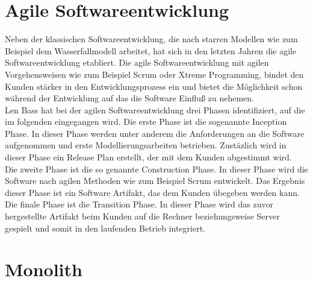 \section{Agile Softwareentwicklung}
Neben der klassischen Softwareentwicklung, die nach starren Modellen wie zum Beispiel dem Wasserfallmodell arbeitet, hat sich in den letzten Jahren die agile Softwareentwicklung etabliert. Die agile Softwareentwicklung mit agilen Vorgehensweisen wie zum Beispiel Scrum oder Xtreme Programming, bindet den Kunden stärker in den Entwicklungsprozess ein und bietet die Möglichkeit schon während der Entwicklung auf das die Software Einfluß zu nehemen. \\
Len Bass hat bei der agilen Softwareentwicklung drei Phasen identifiziert, auf die im folgenden eingegangen wird. Die erste Phase ist die sogenannte Inception Phase. In dieser Phase werden unter anderem die Anforderungen an die Software aufgenommen und erste Modellierungsarbeiten betrieben. Zustäzlich wird in dieser Phase ein Release Plan erstellt, der mit dem Kunden abgestimmt wird.\\
Die zweite Phase ist die so genannte Construction Phase. In dieser Phase wird die Software nach agilen Methoden wie zum Beispiel Scrum entwickelt. Das Ergebnis dieser Phase ist ein Software Artifakt, das dem Kunden übegeben werden kann. \\
Die finale Phase ist die Transition Phase. In dieser Phase wird das zuvor hergestellte Artifakt beim Kunden auf die Rechner beziehungsweise Server gespielt und somit in den laufenden Betrieb integriert.

\section{Monolith}

